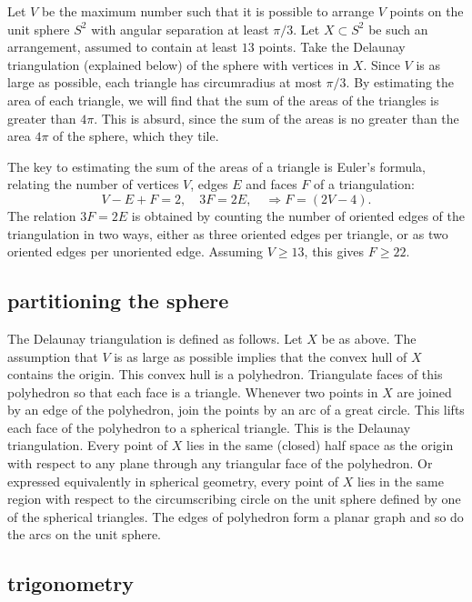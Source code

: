Let $V$ be the maximum
number such that it is possible to arrange $V$ points on the unit
sphere $S^2$ with angular separation at least $\pi/3$.  Let $X\subset S^2$ be
such an arrangement, assumed to contain at least $13$ points. 
Take the Delaunay triangulation (explained below) 
of the sphere with vertices in $X$. Since  $V$ is as large as
possible, each triangle has circumradius at most $\pi/3$.  By estimating
the area of each triangle, we will find that the sum of the areas of the triangles is
greater than $4\pi$.  This is absurd, since the sum of
the areas is no greater than the area $4\pi$ of the sphere, which they tile.

The key to estimating the sum of the areas of a triangle is Euler's formula,
relating the number of vertices $V$, edges $E$ and faces $F$ of
a triangulation:
    $$V - E + F = 2,\quad 3 F = 2 E,\quad \Rightarrow F =
    (2V-4).$$
The relation $3 F = 2 E$ is obtained by counting the number of oriented edges of the
triangulation in two ways, either as three oriented edges per triangle, or as two oriented edges per 
unoriented edge.
Assuming $V\ge 13$, this gives $F\ge 22$. 

\subsection{partitioning the sphere}

The Delaunay triangulation is defined as follows.  Let $X$ be as above.  The
assumption that $V$ is as large as possible implies that the convex hull of $X$
contains the origin.  This convex hull is a polyhedron.  Triangulate faces of
this polyhedron so that each face is a triangle.  Whenever two points in $X$ are
joined by an edge of the polyhedron, join the points by an arc of a great circle.
This lifts each face of the polyhedron to a spherical triangle.  This is the Delaunay
triangulation.  Every point of $X$ lies in the same (closed) half space as the origin with
respect to any plane  through any triangular face of the polyhedron.  
Or expressed equivalently in 
spherical geometry, every point of $X$ lies in the same region with respect to the
circumscribing circle on the unit sphere defined by one of the spherical triangles.
The edges of polyhedron form a planar graph and so do the arcs on the unit sphere.


\subsection{trigonometry}

